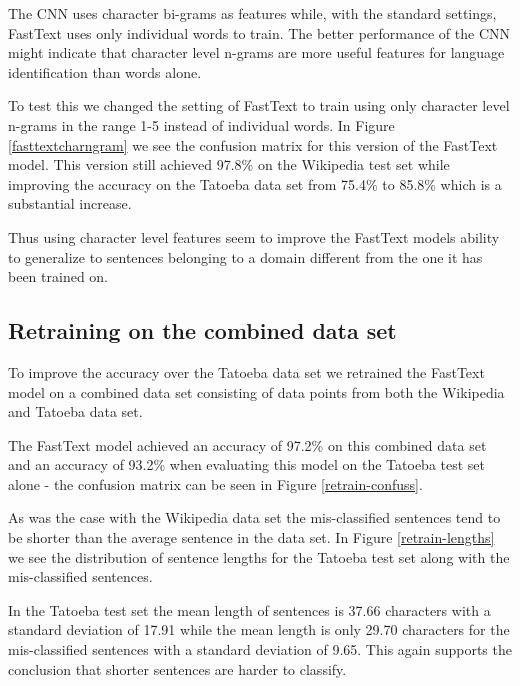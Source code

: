 The CNN uses character bi-grams as features while, with the standard settings, FastText uses only individual words to train. The better performance of the CNN might indicate that character level n-grams are more useful features for language identification than words alone.

To test this we changed the setting of FastText to train using only character level n-grams in the range 1-5 instead of individual words. In Figure \ref{fasttextcharngram} we see the confusion matrix for this version of the FastText model. This version still achieved 97.8\% on the Wikipedia test set while improving the accuracy on the Tatoeba data set from 75.4\% to 85.8\% which is a substantial increase.

Thus using character level features seem to improve the FastText models ability to generalize to sentences belonging to a domain different from the one it has been trained on.\\


\subsection{Retraining on the combined data set}
To improve the accuracy over the Tatoeba data set we retrained the FastText model on a combined data set consisting of data points from
both the Wikipedia and Tatoeba data set.

The FastText model achieved an accuracy of 97.2\% on this combined data set and an accuracy of 93.2\% when evaluating this model on the Tatoeba test set alone - the confusion matrix can be seen in Figure \ref{retrain-confuss}.

As was the case with the Wikipedia data set the mis-classified sentences tend to be shorter than the average sentence in the data set. In Figure \ref{retrain-lengths} we see the distribution of sentence lengths for the Tatoeba test set along with the mis-classified sentences.

In the Tatoeba test set the mean length of sentences is 37.66 characters with a standard deviation of 17.91 while the mean length is only 29.70 characters for the mis-classified sentences with a standard deviation of 9.65. This again supports the conclusion that shorter sentences are harder to classify.

